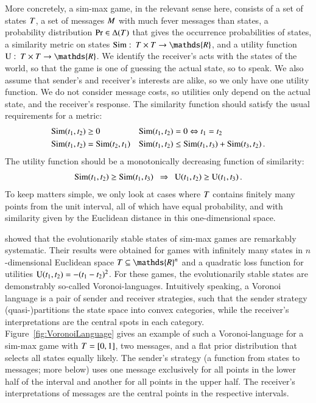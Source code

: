 More concretely, a sim-max game, in the relevant sense here, consists
of a set of states $T$, a set of messages $M$ with much
fever messages than states, a probability distribution $\Pr \in
\Delta(T)$ that gives the occurrence probabilities of states, a
similarity metric on states $\similarity \mycolon \States \times
\States \rightarrow \mathds{R}$, and a utility function $\Utils
\mycolon \States \times \States \rightarrow \mathds{R}$. We identify
the receiver's acts with the states of the world, so that the game is
one of guessing the actual state, so to speak. We also assume that
sender's and receiver's interests are alike, so we only have one
utility function. We do not consider message costs, so utilities only
depend on the actual state, and the receiver's response. The
similarity function should satisfy the usual requirements for a
metric:
\begin{align*}
  & \mathrm{Sim}(t_{\mathrm{1}}, t_{\mathrm{2}}) \ge 0 &&
  \mathrm{Sim}(t_{\mathrm{1}}, t_{\mathrm{2}}) = 0 \Leftrightarrow
  t_{\mathrm{1}} = t_{\mathrm{2}} \\
  & \mathrm{Sim}(t_{\mathrm{1}}, t_{\mathrm{2}}) = \mathrm{Sim}(t_{\mathrm{2}},
  t_{\mathrm{1}}) && \mathrm{Sim}(t_{\mathrm{1}}, t_{\mathrm{2}}) \le
  \mathrm{Sim}(t_{\mathrm{1}}, t_{\mathrm{3}}) + \mathrm{Sim}(t_{\mathrm{3}}, t_{\mathrm{2}})\,.
\end{align*}
The utility function should be a monotonically decreasing function of
similarity:
\begin{align*}
  \similarity(\mystate{1},\mystate{2}) \ge
  \similarity(\mystate{1},\mystate{3}) \ \ \Rightarrow \ \ 
  \Utils(\mystate{1},\mystate{2}) \ge
  \Utils(\mystate{1},\mystate{3})\,.
\end{align*}
To keep matters simple, we only look at cases where $T$ contains
finitely many points from the unit interval, all of which have equal
probability, and with similarity given by the Euclidean distance in
this one-dimensional space.

\citet{JagerMetzger2011:Voronoi-Languag} showed that the
evolutionarily stable states of sim-max games are remarkably
systematic. Their results were obtained for games with infinitely many
states in $n$-dimensional Euclidean space $\States \subseteq
\mathds{R}^n$ and a quadratic loss function for utilities
$\mathrm{U}(t_{\mathrm{1}}, t_{\mathrm{2}}) = - (t_{\mathrm{1}} -
t_{\mathrm{2}})^2$. For these games, the evolutionarily stable states are
demonstrably so-called Voronoi-languages. Intuitively speaking, a
Voronoi language is a pair of sender and receiver strategies, such
that the sender strategy (quasi-)partitions the state space into
convex categories, while the receiver's interpretations are the
central spots in each category. Figure~\ref{fig:VoronoiLanguage} gives
an example of such a Voronoi-language for a sim-max game with
$T = [0,1]$, two messages, and a flat prior distribution that
selects all states equally likely. The sender's strategy (a function
from states to messages; more below) uses one message exclusively for
all points in the lower half of the interval and another for all points in the
upper half. The receiver's interpretations of messages are the
central points in the respective intervals. 


